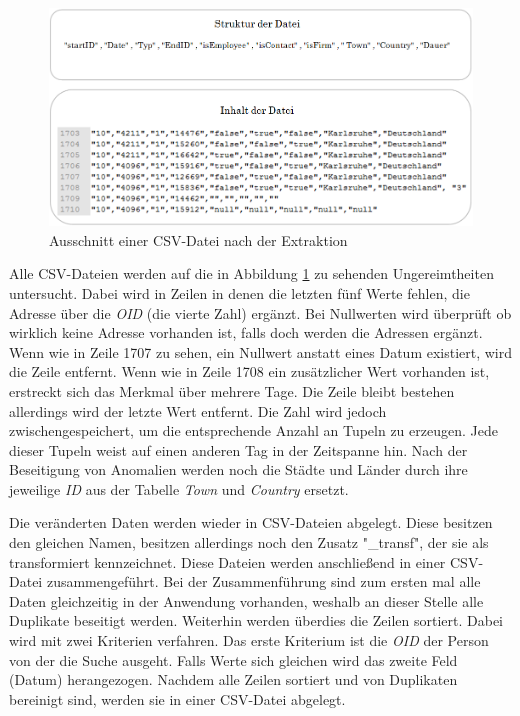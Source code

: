 \begin{figure}[htbp]
\begin{center}
\includegraphics[width=1.0\textwidth]{pics/umsetzung_csv_datei.png}
\caption{Ausschnitt einer CSV-Datei nach der Extraktion}
\label{fig:umsetzung_csv_datei}
\end{center}
\end{figure}

Alle CSV-Dateien werden auf die in Abbildung \ref{fig:umsetzung_csv_datei} zu sehenden Ungereimtheiten untersucht. Dabei wird in Zeilen in denen die letzten fünf Werte fehlen, die Adresse über die \textit{OID} (die vierte Zahl) ergänzt. Bei Nullwerten wird überprüft ob wirklich keine Adresse vorhanden ist, falls doch werden die Adressen ergänzt. Wenn wie in Zeile 1707 zu sehen, ein Nullwert anstatt eines Datum existiert, wird die Zeile entfernt. Wenn wie in Zeile 1708 ein zusätzlicher Wert vorhanden ist, erstreckt sich das Merkmal über mehrere Tage. Die Zeile bleibt bestehen allerdings wird der letzte Wert entfernt. Die Zahl wird jedoch zwischengespeichert, um die entsprechende Anzahl an Tupeln zu erzeugen. Jede dieser Tupeln weist auf einen anderen Tag in der Zeitspanne hin. Nach der Beseitigung von Anomalien werden noch die Städte und Länder durch ihre jeweilige \textit{ID} aus der Tabelle \textit{Town} und \textit{Country} ersetzt.

Die veränderten Daten werden wieder in CSV-Dateien abgelegt. Diese besitzen den gleichen Namen, besitzen allerdings noch den Zusatz "\_transf", der sie als transformiert kennzeichnet. Diese Dateien werden anschließend in einer CSV-Datei zusammengeführt. Bei der Zusammenführung sind zum ersten mal alle Daten gleichzeitig in der Anwendung vorhanden, weshalb an dieser Stelle alle Duplikate beseitigt werden. Weiterhin werden überdies die Zeilen sortiert. Dabei wird mit zwei Kriterien verfahren. Das erste Kriterium ist die \textit{OID} der Person von der die Suche ausgeht. Falls Werte sich gleichen wird das zweite Feld (Datum) herangezogen. Nachdem alle Zeilen sortiert und von Duplikaten bereinigt sind, werden sie in einer CSV-Datei abgelegt. 

